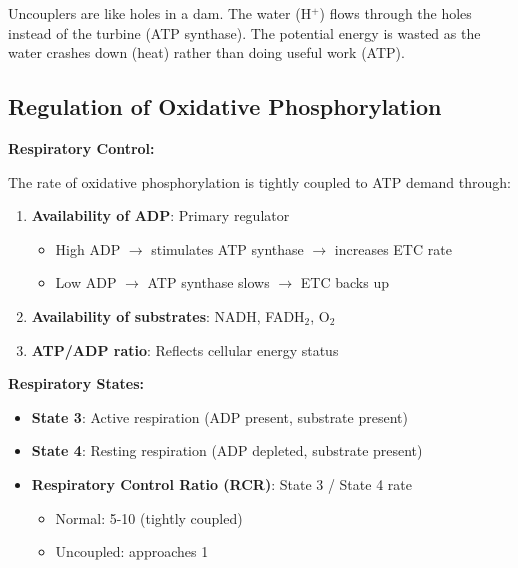 \begin{analogy}
Uncouplers are like holes in a dam. The water (H$^+$) flows through the holes instead of the turbine (ATP synthase). The potential energy is wasted as the water crashes down (heat) rather than doing useful work (ATP).
\end{analogy}

\subsection{Regulation of Oxidative Phosphorylation}

\begin{theorem}
\textbf{Respiratory Control:}

The rate of oxidative phosphorylation is tightly coupled to ATP demand through:

\begin{enumerate}
    \item \textbf{Availability of ADP}: Primary regulator
    \begin{itemize}
        \item High ADP $\rightarrow$ stimulates ATP synthase $\rightarrow$ increases ETC rate
        \item Low ADP $\rightarrow$ ATP synthase slows $\rightarrow$ ETC backs up
    \end{itemize}
    
    \item \textbf{Availability of substrates}: NADH, FADH$_2$, O$_2$
    
    \item \textbf{ATP/ADP ratio}: Reflects cellular energy status
\end{enumerate}
\end{theorem}

\textbf{Respiratory States:}
\begin{itemize}
    \item \textbf{State 3}: Active respiration (ADP present, substrate present)
    \item \textbf{State 4}: Resting respiration (ADP depleted, substrate present)
    \item \textbf{Respiratory Control Ratio (RCR)}: State 3 / State 4 rate
    \begin{itemize}
        \item Normal: 5-10 (tightly coupled)
        \item Uncoupled: approaches 1
    \end{itemize}
\end{itemize}

